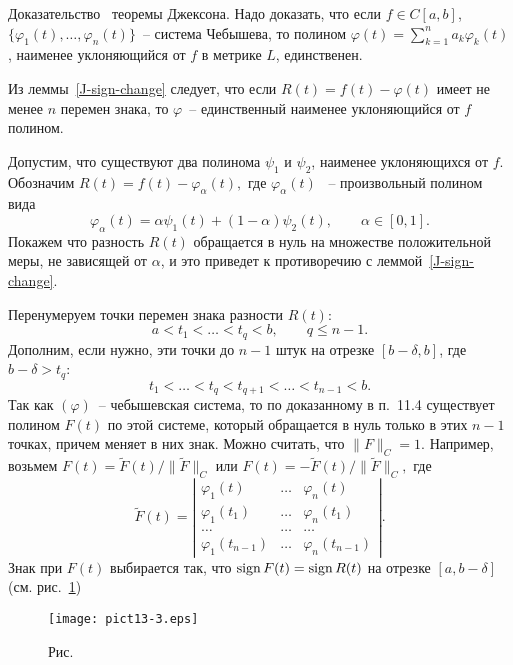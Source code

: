 Д\;о\;к\;а\;з\;а\;т\;е\;л\;ь\;с\;т\;в\;о~ теоремы Джексона. Надо доказать,
что если $f\in C[a,b]$, $\{\varphi_1(t),\ldots,\varphi_n(t)\}$~--
{система Чебышева}, то полином $\varphi(t)=\sum\limits_{k=1}^n a_k
\varphi_k(t)$, наименее уклоняющийся от $f$ в метрике $L$, единственен.

Из леммы~\ref{J-sign-change} следует, что если $R(t)=f(t)-\varphi(t)$
имеет не менее $n$ перемен знака,
то $\varphi$~-- единственный наименее уклоняющийся от $f$ полином.

Допустим, что существуют два полинома $\psi_1$ и $\psi_2$, наименее
уклоняющихся от $f.$
Обозначим $R(t)=f(t)-\varphi_{\alpha}(t),$ где $\varphi_{\alpha}(t)$
~-- произвольный полином вида
$$
{\varphi_\alpha(t)}=\alpha\psi_1(t)+(1-\alpha)\psi_2(t),\qquad \alpha\in [0,1].
$$
{Покажем что} разность $R(t)$ обращается в нуль на множестве
положительной меры, не зависящей от $\alpha$, и это приведет к противоречию с
леммой~\ref{J-sign-change}.

{Перенумеруем} точки перемен знака разности $R(t)$:
$$
a<t_1<\ldots<t_q<b,\qquad q\le n-1.
$$
Дополним, если нужно, эти точки до $n-1$ штук на отрезке $[b-\delta,b]$, где $b-\delta>t_q$:
$$ t_1<\ldots<t_q<t_{q+1}<\ldots<t_{n-1}<b. $$
Так как $(\varphi)$~-- чебышевская система, то по доказанному в п.~11.4
существует полином $F(t)$ по этой системе, который обращается в
нуль только в этих $n-1$ точках, причем меняет в них знак.
Можно считать, что $\|F\|_C=1$. Например, возьмем $F(t)=
\widetilde F(t)/\|\widetilde F\|_C$ или $F(t)=
-\widetilde F(t)/\|\widetilde F\|_C,$ где
$$
\widetilde F(t)=\left|
\begin{array}{ccc}
\varphi_1(t) & \ldots &  \varphi_n(t)\\
\varphi_1(t_1) & \ldots &  \varphi_n(t_1)\\
\ldots & \ldots &  \ldots\\
\varphi_1(t_{n-1}) & \ldots &  \varphi_n(t_{n-1})
\end{array}
\right| .
$$
Знак при $F(t)$ выбирается так, что ${\rm sign \, } F(t)={\rm sign \, } R(t)$
на отрезке $[a,b-\delta]$ (см. рис.~\ref{r13-3})

 \bigskip
\begin{figure}[ht]
\begin{center}
\texttt{[image: pict13-3.eps]}
\end{center}
 \bigskip
 \label{r13-3}

 \centerline{Рис.~\theris}
 \bigskip
\end{figure}


